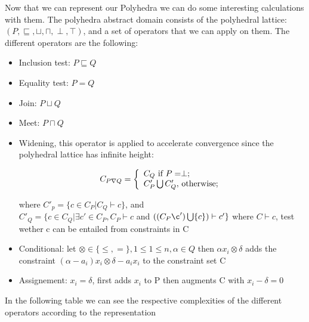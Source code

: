 Now that we can represent our Polyhedra we can do some interesting calculations with them. The polyhedra abstract domain consists of the polyhedral lattice:
	$(P,\sqsubseteq,\sqcup,\sqcap,\perp,\top)$, and a set of operators that we can apply on them. The different operators are the following:
	\begin{itemize}
		\item Inclusion test: $P \sqsubseteq Q$
		\item Equality test: $P=Q$
		\item Join: $P\sqcup Q$
		\item Meet: $P\sqcap Q$
		\item Widening, this operator is applied to accelerate convergence since the polyhedral lattice has infinite height:
		\begin{center}
		  \[
    C_{P\nabla Q}=\left\{
                \begin{array}{ll}
                  C_Q $ if $P=\perp ;\\
                  C'_P\bigcup C'_Q, $ otherwise$;
                \end{array}
              \right.
  	\]
		
		\end{center}

		where $C'_p=\{c\in C_P |C_Q \vdash c \}$, and\\  $C'_Q=\{c\in C_Q |\exists c' \in C_P,C_P \vdash c $ and $((C_P\c')\bigcup \{c\})\vdash c' \}$
		where $C\vdash c$, test wether c can be entailed from constraints in C
		\item Conditional: let $\otimes \in \{\leq,=\},1\leq 1\leq n,\alpha \in Q$ then $\alpha x_i \otimes \delta$ adds the constraint $(\alpha-a_i)x_i \otimes\delta - a_i x_i$ to the constraint set C
		\item Assignement: $x_i = \delta$, first adds $x_i$ to P then augments C with $x_i -\delta = 0$
		
	\end{itemize}
	 In the following table we can see the respective complexities of the different operators according to the representation
	 
